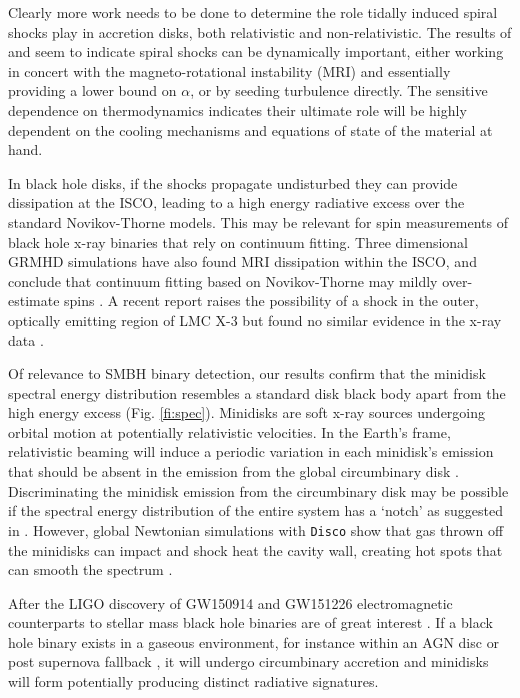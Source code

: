 \documentclass{emulateapj}
\newcommand{\al}{\alpha}
\newcommand{\Disco}{{\texttt{Disco}}}
\begin{document}
Clearly more work needs to be done to determine the role tidally induced spiral shocks play in accretion disks, both relativistic and non-relativistic.  The results of \cite{Ju16} and \cite{Bae16} seem to indicate spiral shocks can be dynamically important, either working in concert with the magneto-rotational instability (MRI) and essentially providing a lower bound on $\al$, or by seeding turbulence directly.  The sensitive dependence on thermodynamics indicates their ultimate role will be highly dependent on the cooling mechanisms and equations of state of the material at hand.

In black hole disks, if the shocks propagate undisturbed they can provide dissipation at the ISCO, leading to a high energy radiative excess over the standard Novikov-Thorne models.  This may be relevant for spin measurements of black hole x-ray binaries that rely on continuum fitting. Three dimensional GRMHD simulations have also found MRI dissipation within the ISCO, and conclude that continuum fitting based on Novikov-Thorne may mildly over-estimate spins \citep{Penna10, Noble10, Kulkarni11, Schnittman15}.  A recent report raises the possibility of a shock in the outer, optically emitting region of LMC X-3 but found no similar evidence in the x-ray data \citep{Steiner14}.

Of relevance to SMBH binary detection, our results confirm that the minidisk spectral energy distribution resembles a standard disk black body apart from the high energy excess (Fig. \ref{fi:spec}).  Minidisks are soft x-ray sources undergoing orbital motion at potentially relativistic velocities.  In the Earth's frame, relativistic beaming will induce a periodic variation in each minidisk's emission that should be absent in the emission from the global circumbinary disk \citep{DOrazio15}.  Discriminating the minidisk emission from the circumbinary disk may be possible if the spectral energy distribution of the entire system has a `notch' as suggested in \cite{Roedig14}.  However, global Newtonian simulations with \Disco{} show that gas thrown off the minidisks can impact and shock heat the cavity wall, creating hot spots that can smooth the spectrum \citep{Farris15A}.

After the LIGO discovery of GW150914 and GW151226 electromagnetic counterparts to stellar mass black hole binaries are of great interest \citep{LIGO16GW150914Discovery, LIGO16GW151226}.  If a black hole binary exists in a gaseous environment, for instance within an AGN disc \citep{Bartos16, Stone17} or post supernova fallback \citep{Perna16}, it will undergo circumbinary accretion and minidisks will form potentially producing distinct radiative signatures.  
\end{document}
